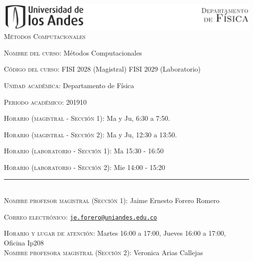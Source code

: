 \documentclass[letterpaper,10pt,onecolumn]{article}
\begin{document}
\begin{center}

\includegraphics[width=490pt]{header.png}\\[0.5cm]

\textsc{\LARGE M\'etodos Computacionales}\\[0.1cm]

\end{center}

\large \noindent\textsc{Nombre del curso:}  M\'etodos Computacionales%
  
\noindent\textsc{C\'odigo del curso:} FISI 2028 (Magistral) FISI 2029 (Laboratorio) %

\noindent\textsc{Unidad acad\'emica:} Departamento de F\'isica

\noindent\textsc{Periodo acad\'emico:} 201910 %

\noindent\textsc{Horario (magistral - Secci\'on 1):} Ma y Ju, 6:30 a 7:50.

\noindent\textsc{Horario (magistral - Secci\'on 2):} Ma y Ju, 12:30 a 13:50.

\noindent\textsc{Horario (laboratorio - Secci\'on 1):} Ma 15:30 - 16:50

\noindent\textsc{Horario (laboratorio - Secci\'on 2):} Mie 14:00 - 15:20

\noindent\rule{\textwidth}{1pt}\\[-0.3cm]

\normalsize \noindent\textsc{Nombre profesor magistral (Secci\'on 1):}
Jaime Ernesto Forero Romero%

\noindent\textsc{Correo electr\'onico:}
\href{mailto:je.forero@uniandes.edu.co}{\nolinkurl{je.forero@uniandes.edu.co}}

\noindent\textsc{Horario y lugar de atenci\'on:} Martes 16:00 a 17:00, Jueves 16:00 a 17:00, Oficina Ip208 
\\[-0.1cm]

\normalsize \noindent\textsc{Nombre profesora magistral (Secci\'on 2):}
Veronica Arias Callejas %
\end{document}
